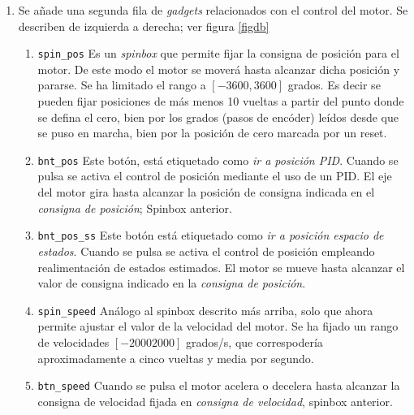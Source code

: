 \begin{enumerate}
\begin{enumerate}
        \item \texttt{btn\_dir} Es un botón que permite alternar el sentido de giro del motor. Por defecto, el sentido de giro que aparece al arrancar el motor es \emph{sentido adelante}. Se corresponde con el giro del motor en sentido antihorario. Al pulsar esté botón cambia el sentido de giro, y también el texto que aparece escrito sobre él. Indicando el sentido de giro actual del motor.
        \item \texttt{btn\_record} Este botón activa/desactiva la grabación de datos en un fichero CSV
        \item \texttt{btn\_cero} Es un botón de reset, que para el motor, lo pasa a control manual y pone a cero todas las variables.
    \end{enumerate}
    \item Se añade una segunda fila de \emph{gadgets} relacionados con el control del motor. Se describen de izquierda a derecha; ver figura \ref{figdb}
    \begin{enumerate}
        \item \texttt{spin\_pos} Es un \emph{spinbox} que permite fijar la consigna de posición para el motor. De este modo el motor se moverá  hasta alcanzar dicha posición y pararse. Se ha limitado el rango a $[-3600, 3600]$ grados. Es decir se pueden fijar posiciones de más menos 10 vueltas a partir del punto donde se defina el cero, bien por los grados (pasos de encóder) leídos desde que se puso en marcha, bien por la posición de cero marcada por un reset.
        \item \texttt{bnt\_pos} Este botón, está etiquetado como \emph{ir a posición PID}. Cuando se pulsa se activa el control de posición mediante el uso de un PID. El eje del motor gira hasta alcanzar la posición de consigna indicada en el \emph{consigna de posición}; Spinbox anterior.
        \item \texttt{bnt\_pos\_ss} Este botón está etiquetado como \emph{ir a posición espacio de estados}. Cuando se pulsa se activa el control de posición empleando realimentación de estados estimados. El motor se mueve hasta alcanzar el valor de consigna indicado en la \emph{consigna de posición}.
        \item \texttt{spin\_speed} Análogo al spinbox descrito más arriba, solo que ahora permite ajustar el valor de la velocidad del motor. Se ha fijado un rango de velocidades $[-2000 2000]$ grados/s, que correspodería aproximadamente a cinco vueltas y media por segundo.
        \item \texttt{btn\_speed} Cuando se pulsa el motor acelera o decelera hasta alcanzar la consigna de velocidad fijada en \emph{consigna de velocidad}, spinbox anterior.

\end{enumerate}
\end{enumerate}
